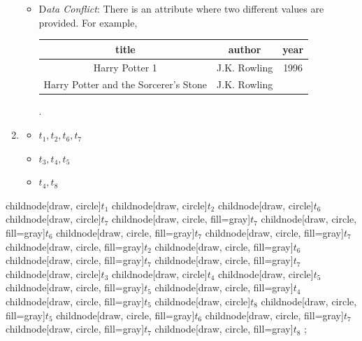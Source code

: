 \documentclass{scrartcl}
\begin{document}
\begin{enumerate}
\begin{itemize}
			\item D\textit{ata Conflict}: There is an attribute where two different values are provided.
			For example,
			\begin{center}
				\begin{tabular}{|c|c|c|}
					\hline
					title & author & year\\
					\hline
					Harry Potter 1 & J.K. Rowling & 1996\\
					Harry Potter and the Sorcerer's Stone & J.K. Rowling &\\
					\hline
				\end{tabular}.
			\end{center}
		\end{itemize}
		
		\item\phantom{phantom}
		\begin{itemize}
			\item $t_1, t_2, t_6, t_7$
			\item $t_3, t_4, t_5$
			\item $t_4, t_8$
		\end{itemize}
	\end{enumerate}
	\begin{landscape}
		\pagestyle{empty}
		\begin{center}
			\hspace*{-5.5cm}
			\begin{tikz}[level 1/.style={sibling distance=3.7cm},
				level 2/.style={sibling distance=1.5cm},
				level 3/.style={sibling distance=1cm},
				level 4/.style={sibling distance=3cm}]
				child{node[draw, circle]{$t_1$}
					child{node[draw, circle]{$t_2$}
						child{node[draw, circle]{$t_6$}
							child{node[draw, circle]{$t_7$}
							}
						}
						child{node[draw, circle, fill=gray]{$t_7$}
						}
					}
					child{node[draw, circle, fill=gray]{$t_6$}
						child{node[draw, circle, fill=gray]{$t_7$}
						}
					}
					child{node[draw, circle, fill=gray]{$t_7$}
					}
				}
				child{node[draw, circle, fill=gray]{$t_2$}
					child{node[draw, circle, fill=gray]{$t_6$}
						child{node[draw, circle, fill=gray]{$t_7$}
						}
					}
					child{node[draw, circle, fill=gray]{$t_7$}
					}
				}
				child{node[draw, circle]{$t_3$}
					child{node[draw, circle]{$t_4$}
						child{node[draw, circle]{$t_5$}
						}
					}
					child{node[draw, circle, fill=gray]{$t_5$}
					}
				}
				child{node[draw, circle, fill=gray]{$t_4$}
					child{node[draw, circle, fill=gray]{$t_5$}
					}
					child{node[draw, circle]{$t_8$}
					}
				}
				child{node[draw, circle, fill=gray]{$t_5$}
				}
				child{node[draw, circle, fill=gray]{$t_6$}
					child{node[draw, circle, fill=gray]{$t_7$}
					}
				}
				child{node[draw, circle, fill=gray]{$t_7$}
				}
				child{node[draw, circle, fill=gray]{$t_8$}
				};
			\end{tikz}
		\end{center}
	\end{landscape}
	
\end{document}
